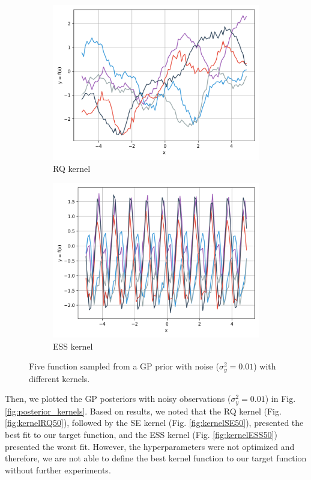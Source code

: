 \documentclass{article}
\begin{document}
\begin{figure}[ht]
\begin{subfigure}{.245\textwidth}
    \includegraphics[width=\linewidth]{kernels/prior/noisy/kernelRQ.png}
    \caption{RQ kernel}
    \label{fig:priorRQ}
  \end{subfigure}
  \begin{subfigure}{.245\textwidth}
    \centering
    \includegraphics[width=\linewidth]{kernels/prior/noisy/kernelESS.png}
    \caption{ESS kernel}
    \label{fig:priorESS}
  \end{subfigure}
  \caption{Five function sampled from a GP prior with noise ($\sigma_y^2 = 0.01$) with different kernels.}
  \label{fig:noisy_priors}
\end{figure}

Then, we plotted the GP posteriors with noisy observations ($\sigma_y^2 = 0.01$) in Fig. \ref{fig:posterior_kernels}. Based on results, we noted that the RQ kernel (Fig. \ref{fig:kernelRQ50}), followed by the SE kernel (Fig. \ref{fig:kernelSE50}), presented the best fit to our target function, and the ESS kernel (Fig. \ref{fig:kernelESS50}) presented the worst fit. However, the hyperparameters were not optimized and therefore, we are not able to define the best kernel function to our target function without further experiments.
\end{document}
